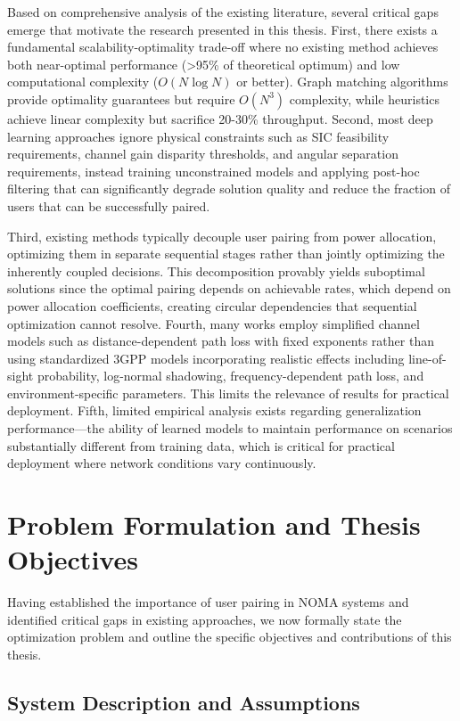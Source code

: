 Based on comprehensive analysis of the existing literature, several critical gaps emerge that motivate the research presented in this thesis. First, there exists a fundamental scalability-optimality trade-off where no existing method achieves both near-optimal performance (>95\% of theoretical optimum) and low computational complexity ($O(N \log N)$ or better). Graph matching algorithms provide optimality guarantees but require $O(N^3)$ complexity, while heuristics achieve linear complexity but sacrifice 20-30\% throughput. Second, most deep learning approaches ignore physical constraints such as SIC feasibility requirements, channel gain disparity thresholds, and angular separation requirements, instead training unconstrained models and applying post-hoc filtering that can significantly degrade solution quality and reduce the fraction of users that can be successfully paired.

Third, existing methods typically decouple user pairing from power allocation, optimizing them in separate sequential stages rather than jointly optimizing the inherently coupled decisions. This decomposition provably yields suboptimal solutions since the optimal pairing depends on achievable rates, which depend on power allocation coefficients, creating circular dependencies that sequential optimization cannot resolve. Fourth, many works employ simplified channel models such as distance-dependent path loss with fixed exponents rather than using standardized 3GPP models incorporating realistic effects including line-of-sight probability, log-normal shadowing, frequency-dependent path loss, and environment-specific parameters. This limits the relevance of results for practical deployment. Fifth, limited empirical analysis exists regarding generalization performance—the ability of learned models to maintain performance on scenarios substantially different from training data, which is critical for practical deployment where network conditions vary continuously.

\section{Problem Formulation and Thesis Objectives}

Having established the importance of user pairing in NOMA systems and identified critical gaps in existing approaches, we now formally state the optimization problem and outline the specific objectives and contributions of this thesis.

\subsection{System Description and Assumptions}

